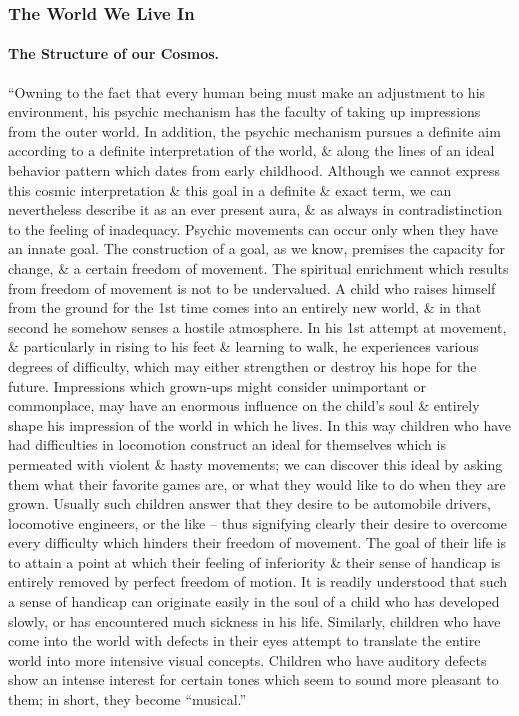 \documentclass{article}
\begin{document}
\subsubsection{The World We Live In}

\paragraph{The Structure of our Cosmos.} ``Owning to the fact that every human being must make an adjustment to his environment, his psychic mechanism has the faculty of taking up impressions from the outer world. In addition, the psychic mechanism pursues a definite aim according to a definite interpretation of the world, \& along the lines of an ideal behavior pattern which dates from early childhood. Although we cannot express this cosmic interpretation \& this goal in a definite \& exact term, we can nevertheless describe it as an ever present aura, \& as always in contradistinction to the feeling of inadequacy. Psychic movements can occur only when they have an innate goal. The construction of a goal, as we know, premises the capacity for change, \& a certain freedom of movement. The spiritual enrichment which results from freedom of movement is not to be undervalued. A child who raises himself from the ground for the 1st time comes into an entirely new world, \& in that second he somehow senses a hostile atmosphere. In his 1st attempt at movement, \& particularly in rising to his feet \& learning to walk, he experiences various degrees of difficulty, which may either strengthen or destroy his hope for the future. Impressions which grown-ups might consider unimportant or commonplace, may have an enormous influence on the child's soul \& entirely shape his impression of the world in which he lives. In this way children who have had difficulties in locomotion construct an ideal for themselves which is permeated with violent \& hasty movements; we can discover this ideal by asking them what their favorite games are, or what they would like to do when they are grown. Usually such children answer that they desire to be automobile drivers, locomotive engineers, or the like -- thus signifying clearly their desire to overcome every difficulty which hinders their freedom of movement. The goal of their life is to attain a point at which their feeling of inferiority \& their sense of handicap is entirely removed by perfect freedom of motion. It is readily understood that such a sense of handicap can originate easily in the soul of a child who has developed slowly, or has encountered much sickness in his life. Similarly, children who have come into the world with defects in their eyes attempt to translate the entire world into more intensive visual concepts. Children who have auditory defects show an intense interest for certain tones which seem to sound more pleasant to them; in short, they become ``musical.''
\end{document}
